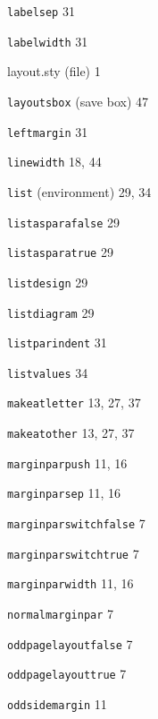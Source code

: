 \documentclass[11pt]{article}
\providecommand{\indexfill}{}
\providecommand{\alphaindexspace}[1]{\indexspace{\bfseries #1}}
\begin{document}
\begin{theindex}
\item \texttt  {\bs labelsep}  \indexfill
   31
\item \texttt  {\bs labelwidth}  \indexfill
   31
\item {\textsf  {layout.sty} (file)}  \indexfill
   1
\item \texttt  {layoutsbox} (save box)  \indexfill
   47
\item \texttt  {\bs leftmargin}  \indexfill
   31
\item \texttt  {\bs linewidth}  \indexfill
   18, 44
\item \texttt  {list} (environment)  \indexfill
   29, 34
\item \texttt  {\bs listasparafalse}  \indexfill
   29
\item \texttt  {\bs listasparatrue}  \indexfill
   29
\item \texttt  {\bs listdesign}  \indexfill
   29
\item \texttt  {\bs listdiagram}  \indexfill
   29
\item \texttt  {\bs listparindent}  \indexfill
   31
\item \texttt  {\bs listvalues}  \indexfill
   34

\alphaindexspace{M}


\item \texttt  {\bs makeatletter}  \indexfill
   13, 27, 37
\item \texttt  {\bs makeatother}  \indexfill
   13, 27, 37
\item \texttt  {\bs marginparpush}  \indexfill
   11, 16
\item \texttt  {\bs marginparsep}  \indexfill
   11, 16
\item \texttt  {\bs marginparswitchfalse}  \indexfill
   7
\item \texttt  {\bs marginparswitchtrue}  \indexfill
   7
\item \texttt  {\bs marginparwidth}  \indexfill
   11, 16

\alphaindexspace{N}


\item \texttt  {\bs normalmarginpar}  \indexfill
   7

\alphaindexspace{O}


\item \texttt  {\bs oddpagelayoutfalse}  \indexfill
   7
\item \texttt  {\bs oddpagelayouttrue}  \indexfill
   7
\item \texttt  {\bs oddsidemargin}  \indexfill
   11


\end{theindex}
\end{document}
